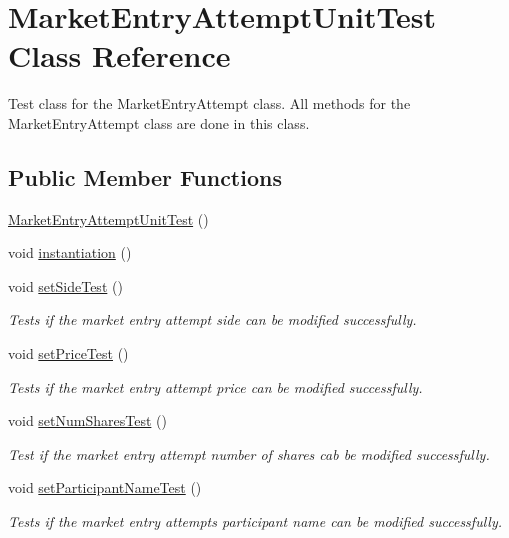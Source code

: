 \hypertarget{class_market_entry_attempt_unit_test}{\section{Market\+Entry\+Attempt\+Unit\+Test Class Reference}
\label{class_market_entry_attempt_unit_test}
}


Test class for the Market\+Entry\+Attempt class. All methods for the Market\+Entry\+Attempt class are done in this class.  


\subsection*{Public Member Functions}
\begin{DoxyCompactItemize}
\item 
\hyperlink{class_market_entry_attempt_unit_test_a355c975279bcf44c446cab4e95d917f1}{Market\+Entry\+Attempt\+Unit\+Test} ()
\item 
void \hyperlink{class_market_entry_attempt_unit_test_a8752b077e8ba58c10a5c434b141478be}{instantiation} ()
\item 
void \hyperlink{class_market_entry_attempt_unit_test_adc84c5cd246a76efbbb3a1b9daa6f941}{set\+Side\+Test} ()
\begin{DoxyCompactList}\small\item\em Tests if the market entry attempt side can be modified successfully. \end{DoxyCompactList}\item 
void \hyperlink{class_market_entry_attempt_unit_test_a5d930961bd06ce170d127d460632a843}{set\+Price\+Test} ()
\begin{DoxyCompactList}\small\item\em Tests if the market entry attempt price can be modified successfully. \end{DoxyCompactList}\item 
void \hyperlink{class_market_entry_attempt_unit_test_a3d3eb8e1fd67afc28bfeab81939ba5de}{set\+Num\+Shares\+Test} ()
\begin{DoxyCompactList}\small\item\em Test if the market entry attempt number of shares cab be modified successfully. \end{DoxyCompactList}\item 
void \hyperlink{class_market_entry_attempt_unit_test_a4be3c23f19aebd62decb5458df7e50c4}{set\+Participant\+Name\+Test} ()
\begin{DoxyCompactList}\small\item\em Tests if the market entry attempts participant name can be modified successfully. \end{DoxyCompactList}\item 

\end{DoxyCompactItemize}
